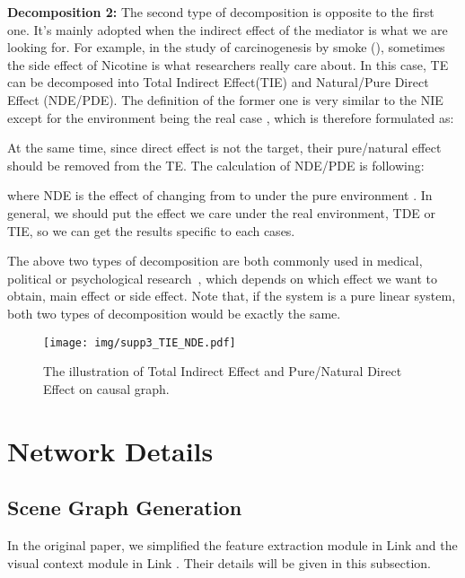 \documentclass[10pt,twocolumn,letterpaper]{article}
\begin{document}
\noindent\textbf{Decomposition 2:} The second type of decomposition is opposite to the first one. It's mainly adopted when the indirect effect of the mediator is what we are looking for. For example, in the study of carcinogenesis by smoke (), sometimes the side effect of Nicotine is what researchers really care about. In this case, TE can be decomposed into Total Indirect Effect(TIE) and Natural/Pure Direct Effect (NDE/PDE). The definition of the former one is very similar to the NIE except for the environment being the real case , which is therefore formulated as:

At the same time, since direct effect is not the target, their pure/natural effect should be removed from the TE. The calculation of NDE/PDE is following:

where NDE is the effect of  changing from  to  under the pure environment . In general, we should put the effect we care under the real environment, \ie TDE or TIE, so we can get the results specific to each cases. 

The above two types of decomposition are both commonly used in medical, political or psychological research~\cite{richiardi2013mediation, keele2015statistics, dunn2015evaluation, mackinnon2007mediation, king2008political}, which depends on which effect we want to obtain, main effect or side effect. Note that, if the system is a pure linear system, both two types of decomposition would be exactly the same. 

\begin{figure}[t!]
   \begin{minipage}[b]{1\linewidth}
   \centerline{\texttt{[image: img/supp3\_TIE\_NDE.pdf]}}
   \end{minipage}
   \caption{The illustration of Total Indirect Effect and Pure/Natural Direct Effect on causal graph.}
   \label{supp_fig:tie_nde} \end{figure}

\section{Network Details}
\label{sec:networks}

\subsection{Scene Graph Generation}
In the original paper, we simplified the feature extraction module in Link  and the visual context module in Link . Their details will be given in this subsection.
\end{document}
